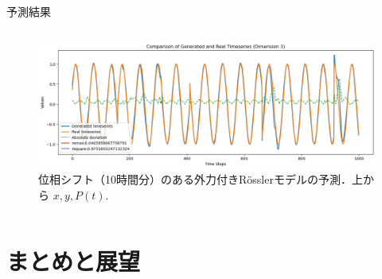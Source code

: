 \begin{frame}{予測結果}
\begin{columns}[T]
\begin{column}{.5\textwidth}
\begin{figure}
        \vspace{.5em}
        \begin{minipage}[c][.27\textheight][c]{\linewidth}
          \centering
          \includegraphics[width=0.7\linewidth]{Fig/10.p.png}
          \caption{\scriptsize{位相シフト（10時間分）のある外力付きRösslerモデルの予測．上から $x, y, P(t)$.}}
        \end{minipage}
      \end{figure}
    \end{column}
  \end{columns}
\end{frame}

\section{まとめと展望}
\begin{frame}
  \begin{columns}[T] %
    \begin{column}{.5\textwidth}
      \begin{figure}
        
      \end{figure}
    \end{column}
    \begin{column}{.5\textwidth}
    \end{column}
  \end{columns}
\end{frame}
